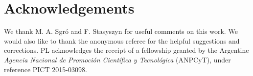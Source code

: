 \documentclass[fleqn,usenatbib]{mnras}
\begin{document}
\section*{Acknowledgements}
We thank M. A. Sgr\'o and F. Stasyszyn for useful comments on this work. We would also like to thank the anonymous referee for the helpful suggestions and corrections. PL acknowledges the receipt of a fellowship granted by the Argentine \emph{Agencia Nacional de Promoci\'on Cient\'ifica y Tecnol\'ogica} (ANPCyT), under reference PICT 2015-03098. 
















\bsp	%
\label{lastpage}
\end{document}
